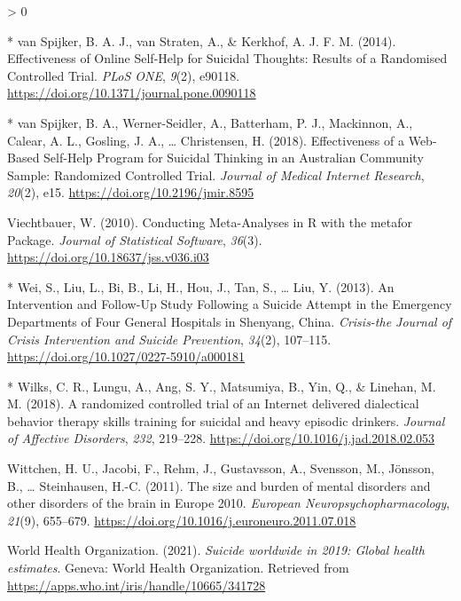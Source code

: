 \documentclass[
  english,
  man]{apa6}
\newlength{\cslhangindent}
\newenvironment{CSLReferences}[2] %
 {%
  \setlength{\parindent}{0pt}
  \ifodd #1 \everypar{\setlength{\hangindent}{\cslhangindent}}\ignorespaces\fi
  \ifnum #2 > 0
  \setlength{\parskip}{#2\baselineskip}
  \fi
 }%
 {}
\begin{document}
\begin{CSLReferences}{1}{0}
\leavevmode\hypertarget{ref-vanspijker2014}{}%
* van Spijker, B. A. J., van Straten, A., \& Kerkhof, A. J. F. M. (2014). Effectiveness of {Online Self}-{Help} for {Suicidal Thoughts}: Results of a {Randomised Controlled Trial}. \emph{PLoS ONE}, \emph{9}(2), e90118. \url{https://doi.org/10.1371/journal.pone.0090118}

\leavevmode\hypertarget{ref-vanspijker2018}{}%
* van Spijker, B. A., Werner-Seidler, A., Batterham, P. J., Mackinnon, A., Calear, A. L., Gosling, J. A., \ldots{} Christensen, H. (2018). Effectiveness of a {Web}-{Based Self}-{Help Program} for {Suicidal Thinking} in an {Australian Community Sample}: Randomized {Controlled Trial}. \emph{Journal of Medical Internet Research}, \emph{20}(2), e15. \url{https://doi.org/10.2196/jmir.8595}

\leavevmode\hypertarget{ref-viechtbauer2010c}{}%
Viechtbauer, W. (2010). Conducting {Meta}-{Analyses} in {R} with the metafor {Package}. \emph{Journal of Statistical Software}, \emph{36}(3). \url{https://doi.org/10.18637/jss.v036.i03}

\leavevmode\hypertarget{ref-wei2013}{}%
* Wei, S., Liu, L., Bi, B., Li, H., Hou, J., Tan, S., \ldots{} Liu, Y. (2013). An {Intervention} and {Follow}-{Up Study Following} a {Suicide Attempt} in the {Emergency Departments} of {Four General Hospitals} in {Shenyang}, {China}. \emph{Crisis-the Journal of Crisis Intervention and Suicide Prevention}, \emph{34}(2), 107--115. \url{https://doi.org/10.1027/0227-5910/a000181}

\leavevmode\hypertarget{ref-wilks2018}{}%
* Wilks, C. R., Lungu, A., Ang, S. Y., Matsumiya, B., Yin, Q., \& Linehan, M. M. (2018). A randomized controlled trial of an {Internet} delivered dialectical behavior therapy skills training for suicidal and heavy episodic drinkers. \emph{Journal of Affective Disorders}, \emph{232}, 219--228. \url{https://doi.org/10.1016/j.jad.2018.02.053}

\leavevmode\hypertarget{ref-wittchen2011a}{}%
Wittchen, H. U., Jacobi, F., Rehm, J., Gustavsson, A., Svensson, M., Jönsson, B., \ldots{} Steinhausen, H.-C. (2011). The size and burden of mental disorders and other disorders of the brain in {Europe} 2010. \emph{European Neuropsychopharmacology}, \emph{21}(9), 655--679. \url{https://doi.org/10.1016/j.euroneuro.2011.07.018}

\leavevmode\hypertarget{ref-worldhealthorganization2021}{}%
World Health Organization. (2021). \emph{Suicide worldwide in 2019: Global health estimates}. {Geneva}: {World Health Organization}. Retrieved from \url{https://apps.who.int/iris/handle/10665/341728}


\end{CSLReferences}
\end{document}
